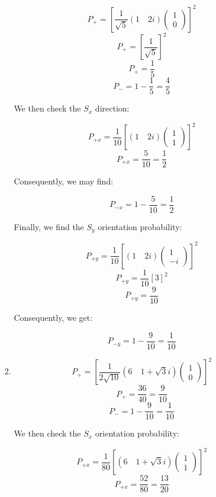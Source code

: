 \begin{enumerate}
\begin{enumerate}
\begin{enumerate}
            $$P_+=\left[\frac{1}{\sqrt{5}}\left( 1 \quad 2i \right)\left( \begin{matrix} 1\\ 0\end{matrix} \right)\right]^2$$
            $$P_+=\left[\frac{1}{\sqrt{5}}\right]^2$$
            $$\boxed{P_+=\frac{1}{5}}$$
            $$\boxed{P_-=1-\frac{1}{5}=\frac{4}{5}}$$

            We then check the $S_x$ direction:

            $$P_{+x}=\frac{1}{10}\left[\left( 1 \quad 2i \right)\left( \begin{matrix} 1\\ 1\end{matrix} \right)\right]^2$$
            $$\boxed{P_{+x}=\frac{5}{10}=\frac{1}{2}}$$

            Consequently, we may find:

            $$\boxed{P_{-x}=1-\frac{5}{10}=\frac{1}{2}}$$

            Finally, we find the $S_y$ orientation probability:

            $$P_{+y}=\frac{1}{10}\left[\left( 1\quad 2i \right)\left( \begin{matrix} 1\\ -i\end{matrix} \right)\right]^2$$
            $$P_{+y}=\frac{1}{10}\left[3\right]^2$$
            $$\boxed{P_{+y}=\frac{9}{10}}$$

            Consequently, we get:

            $$\boxed{P_{-y}=1-\frac{9}{10}=\frac{1}{10}}$$

          \item 

            $$P_+=\left[\frac{1}{2\sqrt{10}}\left(6 \quad 1+\sqrt{3}i \right)\left( \begin{matrix} 1\\ 0\end{matrix} \right)\right]^2$$
            $$\boxed{P_+=\frac{36}{40}=\frac{9}{10}}$$
            $$\boxed{P_-=1-\frac{9}{10}=\frac{1}{10}}$$

            We then check the $S_x$ orientation probability:

            $$P_{+x}=\frac{1}{80}\left[\left( 6 \quad 1+\sqrt{3}i \right)\left( \begin{matrix} 1\\ 1\end{matrix} \right)\right]^2$$
            $$\boxed{P_{+x}=\frac{52}{80}=\frac{13}{20}}$$


\end{enumerate}
\end{enumerate}
\end{enumerate}
